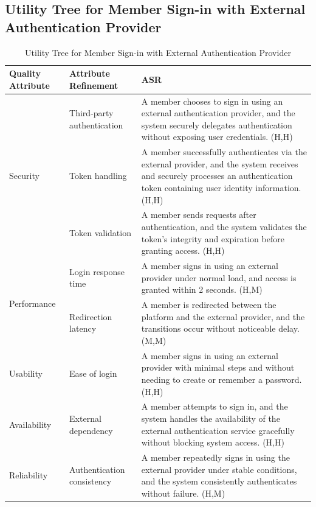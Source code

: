 \documentclass{article}
\begin{document}
\subsection{Utility Tree for Member Sign-in with External Authentication Provider}

\begin{table}[H]
\centering
\caption{Utility Tree for Member Sign-in with External Authentication Provider}
\begin{tabular}{|p{3cm}|p{4cm}|p{7cm}|}
\hline
\textbf{Quality Attribute} & \textbf{Attribute Refinement} & \textbf{ASR} \\
\hline

\multirow{3}{*}{Security}
& Third-party authentication
& A member chooses to sign in using an external authentication provider, and the system securely delegates authentication without exposing user credentials. (H,H) \\
\cline{2-3}
& Token handling
& A member successfully authenticates via the external provider, and the system receives and securely processes an authentication token containing user identity information. (H,H) \\
\cline{2-3}
& Token validation
& A member sends requests after authentication, and the system validates the token’s integrity and expiration before granting access. (H,H) \\
\hline

\multirow{2}{*}{Performance}
& Login response time
& A member signs in using an external provider under normal load, and access is granted within 2 seconds. (H,M) \\
\cline{2-3}
& Redirection latency
& A member is redirected between the platform and the external provider, and the transitions occur without noticeable delay. (M,M) \\
\hline

Usability
& Ease of login
& A member signs in using an external provider with minimal steps and without needing to create or remember a password. (H,H) \\
\hline

Availability
& External dependency
& A member attempts to sign in, and the system handles the availability of the external authentication service gracefully without blocking system access. (H,H) \\
\hline

Reliability
& Authentication consistency
& A member repeatedly signs in using the external provider under stable conditions, and the system consistently authenticates without failure. (H,M) \\
\hline


\end{tabular}
\end{table}
\end{document}
